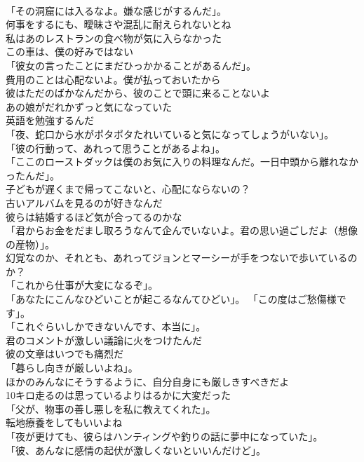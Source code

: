 \documentclass[8pt]{extreport}
\begin{document}
\begin{CJK}{UTF8}{min}
\\	「その洞窟には入るなよ。嫌な感じがするんだ」。	
\\	何事をするにも、曖昧さや混乱に耐えられないとね	
\\	私はあのレストランの食べ物が気に入らなかった	
\\	この車は、僕の好みではない	
\\	「彼女の言ったことにまだひっかかることがあるんだ」。	
\\	費用のことは心配ないよ。僕が払っておいたから	
\\	彼はただのばかなんだから、彼のことで頭に来ることないよ	
\\	あの娘がだれかずっと気になっていた	
\\	[絶対に]英語を勉強するんだ	
\\	「夜、蛇口から水がポタポタたれいていると気になってしょうがいない」。	
\\	「彼の行動って、あれって思うことがあるよね」。	
\\	「ここのローストダックは僕のお気に入りの料理なんだ。一日中頭から離れなかったんだ」。	
\\	子どもが遅くまで帰ってこないと、心配にならないの？	
\\	古いアルバムを見るのが好きなんだ	
\\	彼らは結婚するほど気が合ってるのかな	
\\	「君からお金をだまし取ろうなんて企んでいないよ。君の思い過ごしだよ（想像の産物）」。	
\\	幻覚なのか、それとも、あれってジョンとマーシーが手をつないで歩いているのか？	
\\	「これから仕事が大変になるぞ」。	
\\	「あなたにこんなひどいことが起こるなんてひどい」。 「この度はご愁傷様です」。	
\\	「これぐらいしかできないんです、本当に」。	
\\	君のコメントが激しい議論に火をつけたんだ	
\\	彼の文章はいつでも痛烈だ	
\\	「暮らし向きが厳しいよね」。	
\\	ほかのみんなにそうするように、自分自身にも厳しきすべきだよ	
\\	10キロ走るのは思っているよりはるかに大変だった	
\\	「父が、物事の善し悪しを私に教えてくれた」。	
\\	転地療養をしてもいいよね	
\\	「夜が更けても、彼らはハンティングや釣りの話に夢中になっていた」。	
\\	「彼、あんなに感情の起伏が激しくないといいんだけど」。	

\end{CJK}
\end{document}
